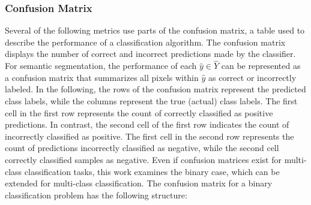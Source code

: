 \subsubsection*{Confusion Matrix}
\label{subsubsec:confusion_matrix}
Several of the following metrics use parts of the confusion matrix, a table used to describe the performance of a classification algorithm. The confusion matrix displays the number of correct and incorrect predictions made by the classifier. For semantic segmentation, the performance of each $\hat{y}\in \hat{Y}$ can be represented as a confusion matrix that summarizes all pixels within $\hat{y}$ as correct or incorrectly labeled. In the following, the rows of the confusion matrix represent the predicted class labels, while the columns represent the true (actual) class labels. The first cell in the first row represents the count of correctly classified as positive predictions.
In contrast, the second cell of the first row indicates the count of incorrectly classified as positive. The first cell in the second row represents the count of predictions incorrectly classified as negative, while the second cell correctly classified samples as negative. Even if confusion matrices exist for multi-class classification tasks, this work examines the binary case, which can be extended for multi-class classification. The confusion matrix for a binary classification problem has the following structure:
